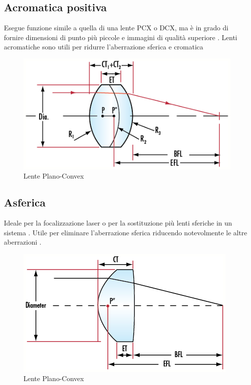 \subsection{Acromatica positiva}
Esegue funzione simile a quella di una lente PCX o DCX, ma è in grado di fornire dimensioni di punto più piccole e immagini di qualità superiore . Lenti acromatiche sono utili per ridurre l'aberrazione sferica e cromatica
\begin{figure}[!ht]
\centering

\includegraphics[width=.3\textwidth]{img/positiva-acromatica.png}

\caption{Lente Plano-Convex}
\label{fig:ccd-blockdiagram}
\end{figure}

\subsection{Asferica}
Ideale per la focalizzazione laser o per la sostituzione più lenti sferiche in un sistema . Utile per eliminare l'aberrazione sferica  riducendo notevolmente le altre aberrazioni .

\begin{figure}[!ht]
\centering

\includegraphics[width=.3\textwidth]{img/asferica.png}

\caption{Lente Plano-Convex}
\label{fig:ccd-blockdiagram}
\end{figure}



